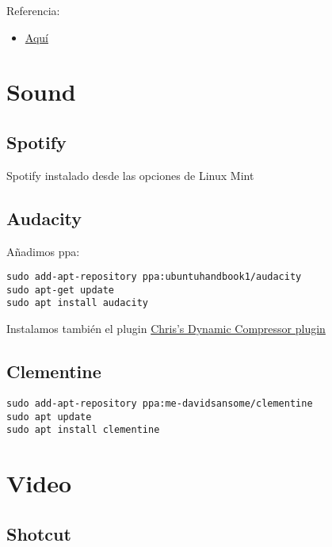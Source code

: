 \documentclass[
  12pt,
  spanish,
]{article}
\providecommand{\tightlist}{%
  \setlength{\itemsep}{0pt}\setlength{\parskip}{0pt}}
\begin{document}
Referencia:

\begin{itemize}
\tightlist
\item
  \href{https://davidrevoy.com/article331/setup-huion-giano-wh1409-tablet-on-linux-mint-18-1-ubuntu-16-04}{Aquí}
\end{itemize}

\hypertarget{sound}{%
\section{Sound}\label{sound}}

\hypertarget{spotify}{%
\subsection{Spotify}\label{spotify}}

Spotify instalado desde las opciones de Linux Mint

\hypertarget{audacity}{%
\subsection{Audacity}\label{audacity}}

Añadimos ppa:

\begin{verbatim}
sudo add-apt-repository ppa:ubuntuhandbook1/audacity
sudo apt-get update
sudo apt install audacity
\end{verbatim}

Instalamos también el plugin
\href{https://theaudacitytopodcast.com/chriss-dynamic-compressor-plugin-for-audacity/}{Chris's
Dynamic Compressor plugin}

\hypertarget{clementine}{%
\subsection{Clementine}\label{clementine}}

\begin{verbatim}
sudo add-apt-repository ppa:me-davidsansome/clementine
sudo apt update
sudo apt install clementine
\end{verbatim}

\hypertarget{video}{%
\section{Video}\label{video}}

\hypertarget{shotcut}{%
\subsection{Shotcut}\label{shotcut}}
\end{document}
